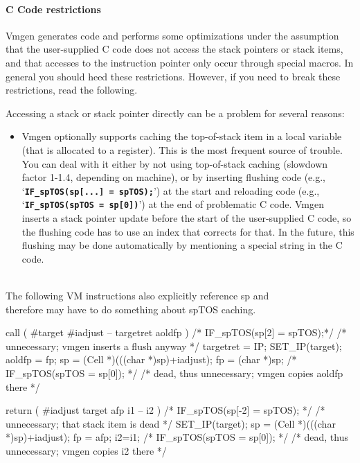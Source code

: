 \documentclass[10pt,english]{article}
\begin{document}
\paragraph{C Code restrictions}

Vmgen generates code and performs some optimizations under the assumption
that the user-supplied C code does not access the stack pointers or
stack items, and that accesses to the instruction pointer only occur
through special macros. In general you should heed these restrictions.
However, if you need to break these restrictions, read the following.

Accessing a stack or stack pointer directly can be a problem for several
reasons:
\begin{itemize}
\item Vmgen optionally supports caching the top-of-stack item in a local
variable (that is allocated to a register). This is the most frequent
source of trouble. You can deal with it either by not using top-of-stack
caching (slowdown factor 1-1.4, depending on machine), or by inserting
flushing code (e.g., \textquoteleft{}\texttt{\textbf{IF\_spTOS(sp{[}...{]}
= spTOS);}}\textquoteright{}) at the start and reloading code (e.g.,
\textquoteleft{}\texttt{\textbf{IF\_spTOS(spTOS = sp{[}0{]})}}\textquoteright{})
at the end of problematic C code. Vmgen inserts a stack pointer update
before the start of the user-supplied C code, so the flushing code
has to use an index that corrects for that. In the future, this flushing
may be done automatically by mentioning a special string in the C
code.
\end{itemize}
\nwenddocs{}\endmoddef
\\ The following VM instructions also explicitly reference sp and
\\ therefore may have to do something about spTOS caching.

call ( #target #iadjust -- targetret aoldfp )
/* IF_spTOS(sp[2] = spTOS);*/ /* unnecessary; vmgen inserts a flush anyway */
targetret = IP;
SET_IP(target);
aoldfp = fp;
sp = (Cell *)(((char *)sp)+iadjust);
fp = (char *)sp;
/* IF_spTOS(spTOS = sp[0]); */ /* dead, thus unnecessary; vmgen copies aoldfp there */

return ( #iadjust target afp i1 -- i2 )
/* IF_spTOS(sp[-2] = spTOS); */ /* unnecessary; that stack item is dead */
SET_IP(target);
sp = (Cell *)(((char *)sp)+iadjust);
fp = afp;
i2=i1;
/* IF_spTOS(spTOS = sp[0]); */ /* dead, thus unnecessary; vmgen copies i2 there */
\end{document}
